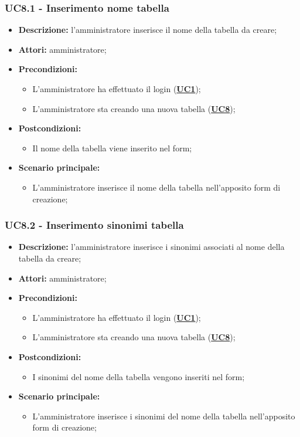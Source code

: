 \subsubsection{UC8.1 - Inserimento nome tabella}
\label{sec:UC8.1}
\begin{itemize}
	\item \textbf{Descrizione:} l’amministratore inserisce il nome della tabella da creare;
	\item \textbf{Attori:} amministratore;
	\item \textbf{Precondizioni:} 
	\begin{itemize}
		\item L’amministratore ha effettuato il login (\hyperref[sec:UC1]{\textbf{UC1}});
		\item L’amministratore sta creando una nuova tabella (\hyperref[sec:UC1]{\textbf{UC8}});
	\end{itemize}
	\item \textbf{Postcondizioni:} 
	\begin{itemize}
		\item Il nome della tabella viene inserito nel form;
	\end{itemize}
	\item \textbf{Scenario principale:} 
	\begin{itemize}
		\item L’amministratore inserisce il nome della tabella nell'apposito form di creazione;
	\end{itemize}
\end{itemize}

\subsubsection{UC8.2 - Inserimento sinonimi tabella}
\label{sec:UC8.2}
\begin{itemize}
	\item \textbf{Descrizione:} l’amministratore inserisce i sinonimi associati al nome della tabella da creare;
	\item \textbf{Attori:} amministratore;
	\item \textbf{Precondizioni:} 
	\begin{itemize}
		\item L’amministratore ha effettuato il login (\hyperref[sec:UC1]{\textbf{UC1}});
		\item L’amministratore sta creando una nuova tabella (\hyperref[sec:UC1]{\textbf{UC8}});
	\end{itemize}
	\item \textbf{Postcondizioni:} 
	\begin{itemize}
		\item I sinonimi del nome della tabella vengono inseriti nel form;
	\end{itemize}
	\item \textbf{Scenario principale:} 
	\begin{itemize}
		\item L’amministratore inserisce i sinonimi del nome della tabella nell'apposito form di creazione;
	\end{itemize}
\end{itemize}

